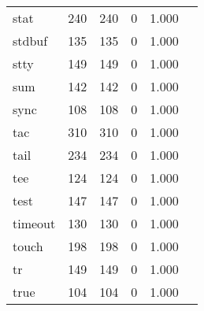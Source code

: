 \begin{longtable}{lp{2.4cm}p{2.4cm}p{2.4cm}p{2.4cm}p{2.4cm}}
stat      &                                    240 &                             240 &                                0 &                                       1.000 \\
stdbuf    &                                    135 &                             135 &                                0 &                                       1.000 \\
stty      &                                    149 &                             149 &                                0 &                                       1.000 \\
sum       &                                    142 &                             142 &                                0 &                                       1.000 \\
sync      &                                    108 &                             108 &                                0 &                                       1.000 \\
tac       &                                    310 &                             310 &                                0 &                                       1.000 \\
tail      &                                    234 &                             234 &                                0 &                                       1.000 \\
tee       &                                    124 &                             124 &                                0 &                                       1.000 \\
test      &                                    147 &                             147 &                                0 &                                       1.000 \\
timeout   &                                    130 &                             130 &                                0 &                                       1.000 \\
touch     &                                    198 &                             198 &                                0 &                                       1.000 \\
tr        &                                    149 &                             149 &                                0 &                                       1.000 \\
true      &                                    104 &                             104 &                                0 &                                       1.000 \\

\end{longtable}
